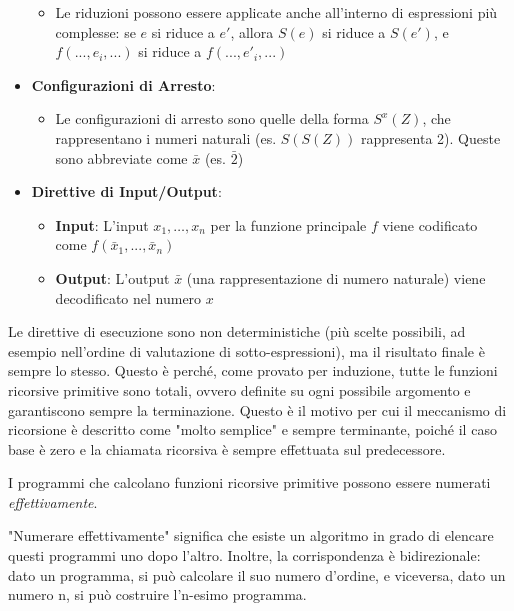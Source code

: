 \documentclass[12pt, a4paper]{report}
\begin{document}
\begin{itemize}
\begin{itemize}
\begin{itemize}
\begin{itemize}
                            \end{itemize}
                        \end{itemize}
                        \item Le riduzioni possono essere applicate anche all'interno di espressioni più complesse: se $e$ si riduce a $e'$, allora $S(e)$ si riduce a $S(e')$, e $f(... , e_i, ...)$ si riduce a $f(... , e'_i, ...)$
                    \end{itemize}
                    \item \textbf{Configurazioni di Arresto}: \begin{itemize}
                        \item Le configurazioni di arresto sono quelle della forma $S^x(Z)$, che rappresentano i numeri naturali (es. $S(S(Z))$ rappresenta 2). Queste sono abbreviate come $\bar{x}$ (es. $\bar{2}$)
                    \end{itemize}
                    \item \textbf{Direttive di Input/Output}: \begin{itemize}
                        \item \textbf{Input}: L'input $x_1, \ldots, x_n$ per la funzione principale $f$ viene codificato come $f(\bar{x}_1, ..., \bar{x}_n)$
                        \item \textbf{Output}: L'output $\bar{x}$ (una rappresentazione di numero naturale) viene decodificato nel numero $x$
                    \end{itemize}
                \end{itemize}
                Le direttive di esecuzione sono non deterministiche (più scelte possibili, ad esempio nell'ordine di valutazione di sotto-espressioni), ma il risultato finale è sempre lo stesso. Questo è perché, come provato per induzione, tutte le funzioni ricorsive primitive sono totali, ovvero definite su ogni possibile argomento e garantiscono sempre la terminazione. Questo è il motivo per cui il meccanismo di ricorsione è descritto come "molto semplice" e sempre terminante, poiché il caso base è zero e la chiamata ricorsiva è sempre effettuata sul predecessore.
                \begin{definitionbox}{}{}
                    I programmi che calcolano funzioni ricorsive primitive possono essere numerati \textit{effettivamente}.
                \end{definitionbox}
                "Numerare effettivamente" significa che esiste un algoritmo in grado di elencare questi programmi uno dopo l'altro. Inoltre, la corrispondenza è bidirezionale: dato un programma, si può calcolare il suo numero d'ordine, e viceversa, dato un numero n, si può costruire l'n-esimo programma.
\end{document}

